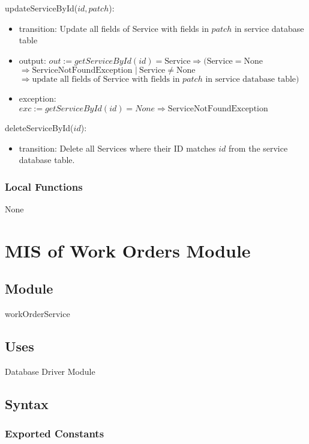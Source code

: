 \documentclass[12pt, titlepage]{article}
\begin{document}
\noindent updateServiceById($id, patch$):
\begin{itemize}
	\item transition: Update all fields of Service with fields in $patch$ in service database table
	\item output: $out := getServiceById(id) = \text{Service} \Rightarrow (\text{Service} = \text{None} $ \\
		      $\Rightarrow \text{ServiceNotFoundException } |\ \text{Service} \neq \text{None}$ \\ $\Rightarrow
		      \text{update all fields of Service with fields in } patch \text{ in service database table})$
	\item exception: $exc := getServiceById(id) = None \Rightarrow \text{ServiceNotFoundException}$
\end{itemize}

\noindent deleteServiceById($id$):
\begin{itemize}
	\item transition: Delete all Services where their ID matches $id$ from the service database table.
\end{itemize}

\subsubsection{Local Functions}

None

\newpage

\section{MIS of Work Orders Module} \label{mWorkOrders}
\subsection{Module}

workOrderService

\subsection{Uses}

Database Driver Module

\subsection{Syntax}

\subsubsection{Exported Constants}
\end{document}
